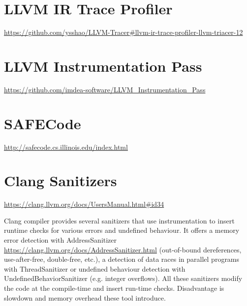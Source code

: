\section{LLVM IR Trace Profiler}

\url{https://github.com/ysshao/LLVM-Tracer#llvm-ir-trace-profiler-llvm-triacer-12}

\section{LLVM Instrumentation Pass}

\url{https://github.com/imdea-software/LLVM\_Instrumentation\_Pass}

\section{SAFECode}

\url{http://safecode.cs.illinois.edu/index.html}

\section{Clang Sanitizers}

\url{https://clang.llvm.org/docs/UsersManual.html#id34}
\medskip

Clang compiler provides several sanitizers that use instrumentation to insert
runtime checks for various errors and undefined behaviour. It offers a memory
error detection with AddressSanitizer
\textcolor{red}{\url{https://clang.llvm.org/docs/AddressSanitizer.html}}
(out-of-bound dereferences, use-after-free, double-free, etc.), a detection of
data races in parallel programs with ThreadSanitizer or undefined behaviour
detection with UndefinedBehaviorSanitizer (e.g. integer overflows). All these
sanitizers modify the code at the compile-time and insert run-time checks.
Disadvantage is slowdown and memory overhead these tool introduce.
